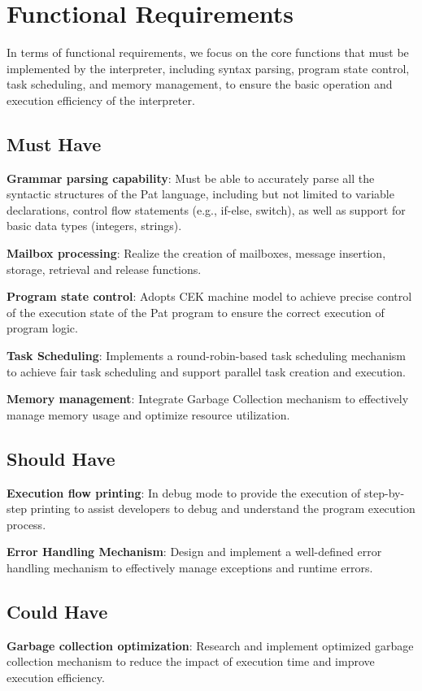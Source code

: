 \documentclass{l4proj}
\begin{document}
\section{Functional Requirements}
In terms of functional requirements, we focus on the core functions that must be implemented by the interpreter, including syntax parsing, program state control, task scheduling, and memory management, to ensure the basic operation and execution efficiency of the interpreter.

\subsection{Must Have}
\textbf{Grammar parsing capability}: Must be able to accurately parse all the syntactic structures of the Pat language, including but not limited to variable declarations, control flow statements (e.g., if-else, switch), as well as support for basic data types (integers, strings).

\textbf{Mailbox processing}: Realize the creation of mailboxes, message insertion, storage, retrieval and release functions.

\textbf{Program state control}: Adopts CEK machine model to achieve precise control of the execution state of the Pat program to ensure the correct execution of program logic.

\textbf{Task Scheduling}: Implements a round-robin-based task scheduling mechanism to achieve fair task scheduling and support parallel task creation and execution.

\textbf{Memory management}: Integrate Garbage Collection mechanism to effectively manage memory usage and optimize resource utilization.

\subsection{Should Have}
\textbf{Execution flow printing}: In debug mode to provide the execution of step-by-step printing to assist developers to debug and understand the program execution process.

\textbf{Error Handling Mechanism}: Design and implement a well-defined error handling mechanism to effectively manage exceptions and runtime errors.

\subsection{Could Have}
\textbf{Garbage collection optimization}: Research and implement optimized garbage collection mechanism to reduce the impact of execution time and improve execution efficiency.
\end{document}
